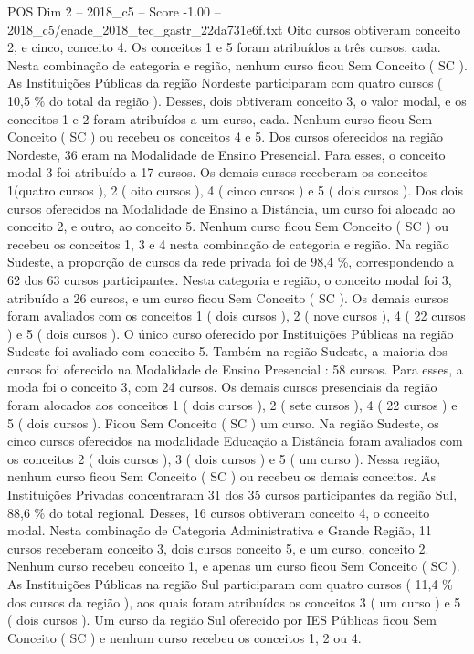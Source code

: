 \begin{textsample}{POS Dim 2 – 2018\_c5 – Score -1.00 – 2018\_c5/enade\_2018\_tec\_gastr\_22da731e6f.txt}
Oito cursos obtiveram conceito 2, e cinco, conceito 4.
Os conceitos 1 e 5 foram atribuídos a três cursos, cada.
Nesta combinação de categoria e região, nenhum curso ficou Sem Conceito ( SC ).
As Instituições Públicas da região Nordeste participaram com quatro cursos ( 10,5 \% do total da região ).
Desses, dois obtiveram conceito 3, o valor modal, e os conceitos 1 e 2 foram atribuídos a um curso, cada.
Nenhum curso ficou Sem Conceito ( SC ) ou recebeu os conceitos 4 e 5.
Dos cursos oferecidos na região Nordeste, 36 eram na Modalidade de Ensino Presencial.
Para esses, o conceito modal 3 foi atribuído a 17 cursos.
Os demais cursos receberam os conceitos 1(quatro cursos ), 2 ( oito cursos ), 4 ( cinco cursos ) e 5 ( dois cursos ).
Dos dois cursos oferecidos na Modalidade de Ensino a Distância, um curso foi alocado ao conceito 2, e outro, ao conceito 5.
Nenhum curso ficou Sem Conceito ( SC ) ou recebeu os conceitos 1, 3 e 4 nesta combinação de categoria e região.
Na região Sudeste, a proporção de cursos da rede privada foi de 98,4 \%, correspondendo a 62 dos 63 cursos participantes.
Nesta categoria e região, o conceito modal foi 3, atribuído a 26 cursos, e um curso ficou Sem Conceito ( SC ).
Os demais cursos foram avaliados com os conceitos 1 ( dois cursos ), 2 ( nove cursos ), 4 ( 22 cursos ) e 5 ( dois cursos ).
O único curso oferecido por Instituições Públicas na região Sudeste foi avaliado com conceito 5.
Também na região Sudeste, a maioria dos cursos foi oferecido na Modalidade de Ensino Presencial : 58 cursos.
Para esses, a moda foi o conceito 3, com 24 cursos.
Os demais cursos presenciais da região foram alocados aos conceitos 1 ( dois cursos ), 2 ( sete cursos ), 4 ( 22 cursos ) e 5 ( dois cursos ).
Ficou Sem Conceito ( SC ) um curso.
Na região Sudeste, os cinco cursos oferecidos na modalidade Educação a Distância foram avaliados com os conceitos 2 ( dois cursos ), 3 ( dois cursos ) e 5 ( um curso ).
Nessa região, nenhum curso ficou Sem Conceito ( SC ) ou recebeu os demais conceitos.
As Instituições Privadas concentraram 31 dos 35 cursos participantes da região Sul, 88,6 \% do total regional.
Desses, 16 cursos obtiveram conceito 4, o conceito modal.
Nesta combinação de Categoria Administrativa e Grande Região, 11 cursos receberam conceito 3, dois cursos conceito 5, e um curso, conceito 2.
Nenhum curso recebeu conceito 1, e apenas um curso ficou Sem Conceito ( SC ).
As Instituições Públicas na região Sul participaram com quatro cursos ( 11,4 \% dos cursos da região ), aos quais foram atribuídos os conceitos 3 ( um curso ) e 5 ( dois cursos ).
Um curso da região Sul oferecido por IES Públicas ficou Sem Conceito ( SC ) e nenhum curso recebeu os conceitos 1, 2 ou 4.

\end{textsample}
